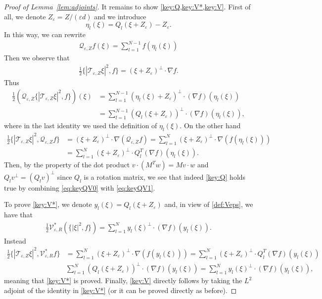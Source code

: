 \documentclass[11pt,reqno,a4paper]{amsart}
\def\eps{\varepsilon}
\newcommand{\cQ}{\mathcal{Q}}
\newcommand{\cT}{\mathcal{T}}
\newcommand{\cV}{\mathcal{V}}
\newcommand{\1}{\mathbbm{1}}
\theoremstyle{definition}
\theoremstyle{definition}
\numberwithin{equation}{section}
\begin{document}
\begin{proof}[Proof of Lemma~\ref{lem:adjoints}]
It remains to show \cref{key:Q,key:V*,key:V}. First of all, we denote $Z_\eps=Z/(\eps d)$ and we introduce 
\begin{equation}
    \eta_l(\xi)=Q_l(\xi+Z_\eps)-Z_\eps.
\end{equation}
In this way, we can rewrite 
\begin{align}
    \cQ_{\eps, Z}f(\xi)=\sum_{l=1}^{N-1}f(\eta_l(\xi))
\end{align}
Then we observe that 
\begin{align}
    \frac12\{|\cT_{\eps,Z}\xi|^2,f\}=(\xi+Z_\eps)^\perp \cdot \nabla f.
\end{align}
Thus 
\begin{align}
    \frac12(\cQ_{\eps,Z}\{|\cT_{\eps,Z}\xi|^2,f\})(\xi)&=\sum_{l=1}^{N-1}(\eta_l(\xi)+Z_\eps)^\perp \cdot (\nabla f)(\eta_l(\xi))\\
    \label{eq:keyQV0}&=\sum_{l=1}^{N-1}(Q_l(\xi+Z_\eps))^\perp \cdot (\nabla f)(\eta_l(\xi)),
\end{align}
    where in the last identity we used the definition of $\eta_l(\xi).$ On the other hand 
    \begin{align}
            \frac12\{|\cT_{\eps,Z}\xi|^2,\cQ_{\eps,Z}f\}&=(\xi+Z_\eps)^\perp \cdot \nabla (\cQ_{\eps,Z}f)=\sum_{l=1}^N(\xi+Z_\eps)^\perp \cdot \nabla (f(\eta_l(\xi)))\\
    \label{eq:keyQV1}&=\sum_{l=1}^N(\xi+Z_\eps)^\perp \cdot Q_l^T (\nabla f)(\eta_l(\xi)).
    \end{align}
    Then, by the property of the dot product $v\cdot (M^T w)=Mv\cdot  w$ and $Q_lv^\perp=(Q_l v)^\perp$ since $Q_l$ is a rotation matrix, we see that indeed \cref{key:Q} holds true by combining \cref{eq:keyQV0} with \cref{eq:keyQV1}.

    To prove  \cref{key:V*}, we denote $y_l(\xi)=Q_l(\xi+Z_\eps)$ and, in view of \cref{def:Veps}, we have that 
    \begin{align}
        \frac12\cV_{\eps,R}^*(\{|\xi|^2,f\})=\sum_{l=1}^N y_l(\xi)^\perp \cdot (\nabla f)(y_l(\xi)).
    \end{align}
    Instead
    \begin{align}
          \frac12\{|\cT_{\eps,Z}\xi|^2,  \cV_{\eps,R}^*f\}&=\sum_{l=1}^N(\xi+Z_\eps)^\perp \cdot \nabla (f(y_l(\xi)))=\sum_{l=1}^N(\xi+Z_\eps)^\perp \cdot Q_l^T (\nabla f)(y_l(\xi))\\
      &\sum_{l=1}^N(Q_l(\xi+Z_\eps))^\perp \cdot  (\nabla f)(y_l(\xi))=\sum_{l=1}^N y_l(\xi)^\perp \cdot (\nabla f)(y_l(\xi)),
    \end{align}
    meaning that \cref{key:V*} is proved.
    Finally, \cref{key:V} directly follows by taking the $L^2$ adjoint of the identity in \cref{key:V*} (or it can be proved directly as before).
\end{proof}
\end{document}
